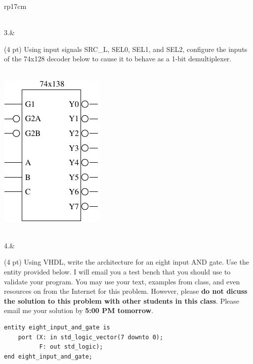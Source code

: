 \documentclass{article}
\begin{document}
\begin{longtable}[l]{rp{17cm}}
\begin{minipage}[t]{\linewidth}
\vspace{6cm
}
\end{minipage}\\
\medskip
3.&\begin{minipage}[t]{\linewidth}(4 pt) Using input signals SRC\_L, SEL0, SEL1, and SEL2, configure the inputs of the 74x128 decoder below to cause it to behave as a 1-bit demultiplexer.\\ \\
\begin{center}
  \includegraphics{../Muxes/Assessments/74x138Schematic}
\end{center}

\vspace{4cm
}
\end{minipage}\\
\newpage
4.&\begin{minipage}[t]{\linewidth}(4 pt) Using VHDL, write the architecture for an eight input AND gate.  Use the entity provided below.  I will email you a test bench that you should use to validate your program.  You may use your text, examples from class, and even resources on from the Internet for this problem.  However, please \textbf{do not dicuss the solution to this problem with other students in this class}.  Please email me your solution by \textbf{5:00 PM tomorrow}.\\
\lstset{language=VHDL}
\begin{lstlisting}
entity eight_input_and_gate is
    port (X: in std_logic_vector(7 downto 0);
          F: out std_logic);
end eight_input_and_gate;
\end{lstlisting}

\vspace{2cm
}
\end{minipage}\\
\medskip
\end{longtable}
\end{document}
